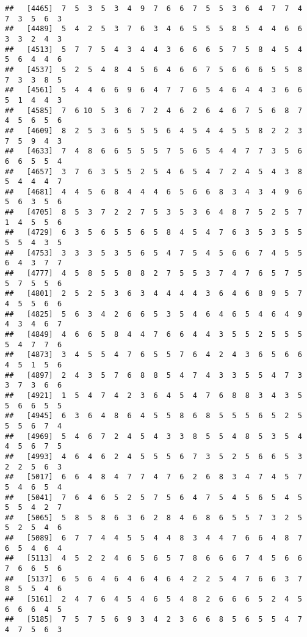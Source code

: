 \documentclass[
]{book}
\begin{document}
\begin{verbatim}
##   [4465]  7  5  3  5  3  4  9  7  6  6  7  5  5  3  6  4  7  7  4  7  3  5  6  3
##   [4489]  5  4  2  5  3  7  6  3  4  6  5  5  5  8  5  4  4  6  6  3  3  2  4  3
##   [4513]  5  7  7  5  4  3  4  4  3  6  6  6  5  7  5  8  4  5  4  5  6  4  4  6
##   [4537]  5  2  5  4  8  4  5  6  4  6  6  7  5  6  6  6  5  5  8  7  3  3  8  5
##   [4561]  5  4  4  6  6  9  6  4  7  7  6  5  4  6  4  4  3  6  6  5  1  4  4  3
##   [4585]  7  6 10  5  3  6  7  2  4  6  2  6  4  6  7  5  6  8  7  4  5  6  5  6
##   [4609]  8  2  5  3  6  5  5  5  6  4  5  4  4  5  5  8  2  2  3  7  5  9  4  3
##   [4633]  7  4  8  6  6  5  5  5  7  5  6  5  4  4  7  7  3  5  6  6  6  5  5  4
##   [4657]  3  7  6  3  5  5  2  5  4  6  5  4  7  2  4  5  4  3  8  5  4  4  4  7
##   [4681]  4  4  5  6  8  4  4  4  6  5  6  6  8  3  4  3  4  9  6  5  6  3  5  6
##   [4705]  8  5  3  7  2  2  7  5  3  5  3  6  4  8  7  5  2  5  7  1  4  5  5  6
##   [4729]  6  3  5  6  5  5  6  5  8  4  5  4  7  6  3  5  3  5  5  5  5  4  3  5
##   [4753]  3  3  3  5  3  5  6  5  4  7  5  4  5  6  6  7  4  5  5  6  4  3  7  7
##   [4777]  4  5  8  5  5  8  8  2  7  5  5  3  7  4  7  6  5  7  5  5  7  5  5  6
##   [4801]  2  5  2  5  3  6  3  4  4  4  4  3  6  4  6  8  9  5  7  4  5  5  6  6
##   [4825]  5  6  3  4  2  6  6  5  3  5  4  6  4  6  5  4  6  4  9  4  3  4  6  7
##   [4849]  4  6  6  5  8  4  4  7  6  6  4  4  3  5  5  2  5  5  5  5  4  7  7  6
##   [4873]  3  4  5  5  4  7  6  5  5  7  6  4  2  4  3  6  5  6  6  4  5  1  5  6
##   [4897]  2  4  3  5  7  6  8  8  5  4  7  4  3  3  5  5  4  7  3  3  7  3  6  6
##   [4921]  1  5  4  7  4  2  3  6  4  5  4  7  6  8  8  3  4  3  5  5  6  6  5  5
##   [4945]  6  3  6  4  8  6  4  5  5  8  6  8  5  5  5  6  5  2  5  5  5  6  7  4
##   [4969]  5  4  6  7  2  4  5  4  3  3  8  5  5  4  8  5  3  5  4  4  5  6  7  5
##   [4993]  4  6  4  6  2  4  5  5  5  6  7  3  5  2  5  6  6  5  3  2  2  5  6  3
##   [5017]  6  6  4  8  4  7  7  4  7  6  2  6  8  3  4  7  4  5  7  5  4  6  5  4
##   [5041]  7  6  4  6  5  2  5  7  5  6  4  7  5  4  5  6  5  4  5  5  5  4  2  7
##   [5065]  5  8  5  8  6  3  6  2  8  4  6  8  6  5  5  7  3  2  5  5  2  5  4  6
##   [5089]  6  7  7  4  4  5  5  4  4  8  3  4  4  7  6  6  4  8  7  6  5  4  6  4
##   [5113]  4  5  2  2  4  6  5  6  5  7  8  6  6  6  7  4  5  6  6  7  6  6  5  6
##   [5137]  6  5  6  4  6  4  6  4  6  4  2  2  5  4  7  6  6  3  7  8  5  5  4  6
##   [5161]  2  4  7  6  4  5  4  6  5  4  8  2  6  6  6  5  2  4  5  6  6  6  4  5
##   [5185]  7  5  7  5  6  9  3  4  2  3  6  6  8  5  6  5  5  4  7  4  7  5  6  3

\end{verbatim}
\end{document}
